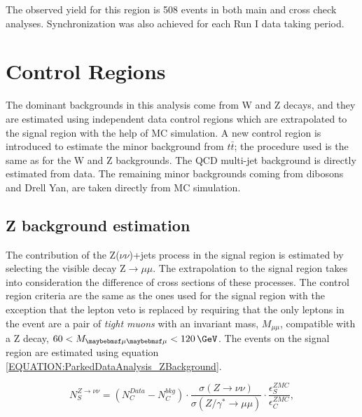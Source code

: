 The observed yield for this region is 508 events in both main and cross check analyses. Synchronization was also achieved for each Run I data taking period.  

\section{Control Regions}
\label{SECTION:ParkedDataAnalysis_ControlRegions}


The dominant backgrounds in this analysis come from W and Z decays, and they are estimated using independent data control regions which are extrapolated to the signal region with the help of \gls{MC} simulation. A new control region is introduced to estimate the minor background from $t\bar{t}$; the procedure used is the same as for the W and Z backgrounds. The \gls{QCD} multi-jet background is directly estimated from data. The remaining minor backgrounds coming from dibosons and Drell Yan, are taken directly from \gls{MC} simulation.

\subsection{Z background estimation}
\label{SECTION:ParkedDataAnalysis_ControlRegions_ZBackground}


The contribution of the Z($\nu\nu$)+jets process in the signal region is estimated by selecting the visible decay Z$\rightarrow\mu\mu$. The extrapolation to the signal region takes into consideration the difference of cross sections of these processes. The control region criteria are the same as the ones used for the signal region with the exception that the lepton veto is replaced by requiring that the only leptons in the event are a pair of \textit{tight muons} with an invariant mass, $M_{\mu\mu}$, compatible with a Z decay, $60<M_{\mu\mu}<120\,\GeV$. The events on the signal region are estimated using equation \ref{EQUATION:ParkedDataAnalysis_ZBackground}.

\begin{equation}
N_{S}^{Z\rightarrow\nu\nu}=\left(N_{C}^{Data}-N_{C}^{bkg}\right) \cdot\frac{\sigma\left(Z\rightarrow\nu\nu\right)}{\sigma\left(Z/\gamma^{*}\rightarrow\mu\mu\right)}\cdot \frac{\epsilon_{S}^{ZMC}}{\epsilon_{C}^{ZMC}},
\label{EQUATION:ParkedDataAnalysis_ZBackground}
\end{equation}

